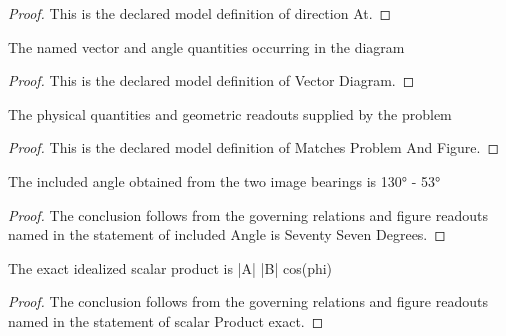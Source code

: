\begin{proof}
  This is the declared model definition of direction At.
\end{proof}
\begin{definition}
  \label{def:physics:phyx-mini-0791:phyxminiproblems-problemphyxmini0791-vectordiagram}
  The named vector and angle quantities occurring in the diagram
\end{definition}
\begin{proof}
  This is the declared model definition of Vector Diagram.
\end{proof}
\begin{definition}
  \label{def:physics:phyx-mini-0791:phyxminiproblems-problemphyxmini0791-matchesproblemandfigure}
  The physical quantities and geometric readouts supplied by the problem
\end{definition}
\begin{proof}
  This is the declared model definition of Matches Problem And Figure.
\end{proof}
\begin{lemma}
  \label{lem:physics:phyx-mini-0791:phyxminiproblems-problemphyxmini0791-includedangle-isseventysevendegrees}
  The included angle obtained from the two image bearings is 130° - 53°
\end{lemma}
\begin{proof}
  The conclusion follows from the governing relations and figure readouts named in the statement of included Angle is Seventy Seven Degrees.
\end{proof}
\begin{lemma}
  \label{lem:physics:phyx-mini-0791:phyxminiproblems-problemphyxmini0791-scalarproduct-exact}
  The exact idealized scalar product is |A| |B| cos(phi)
\end{lemma}
\begin{proof}
  The conclusion follows from the governing relations and figure readouts named in the statement of scalar Product exact.
\end{proof}
